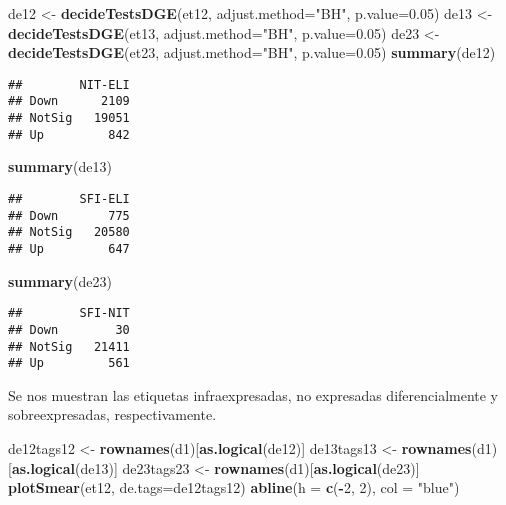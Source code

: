 \documentclass[
]{article}
\newenvironment{Shaded}{\begin{snugshade}}{\end{snugshade}}
\newcommand{\DataTypeTok}[1]{\textcolor[rgb]{0.13,0.29,0.53}{#1}}
\newcommand{\DecValTok}[1]{\textcolor[rgb]{0.00,0.00,0.81}{#1}}
\newcommand{\FloatTok}[1]{\textcolor[rgb]{0.00,0.00,0.81}{#1}}
\newcommand{\KeywordTok}[1]{\textcolor[rgb]{0.13,0.29,0.53}{\textbf{#1}}}
\newcommand{\NormalTok}[1]{#1}
\newcommand{\OperatorTok}[1]{\textcolor[rgb]{0.81,0.36,0.00}{\textbf{#1}}}
\newcommand{\StringTok}[1]{\textcolor[rgb]{0.31,0.60,0.02}{#1}}
\begin{document}
\begin{Shaded}
\begin{Highlighting}[]
\NormalTok{de12 <-}\StringTok{ }\KeywordTok{decideTestsDGE}\NormalTok{(et12, }\DataTypeTok{adjust.method=}\StringTok{"BH"}\NormalTok{, }\DataTypeTok{p.value=}\FloatTok{0.05}\NormalTok{)}
\NormalTok{de13 <-}\StringTok{ }\KeywordTok{decideTestsDGE}\NormalTok{(et13, }\DataTypeTok{adjust.method=}\StringTok{"BH"}\NormalTok{, }\DataTypeTok{p.value=}\FloatTok{0.05}\NormalTok{)}
\NormalTok{de23 <-}\StringTok{ }\KeywordTok{decideTestsDGE}\NormalTok{(et23, }\DataTypeTok{adjust.method=}\StringTok{"BH"}\NormalTok{, }\DataTypeTok{p.value=}\FloatTok{0.05}\NormalTok{)}
\KeywordTok{summary}\NormalTok{(de12)}
\end{Highlighting}
\end{Shaded}

\begin{verbatim}
##        NIT-ELI
## Down      2109
## NotSig   19051
## Up         842
\end{verbatim}

\begin{Shaded}
\begin{Highlighting}[]
\KeywordTok{summary}\NormalTok{(de13)}
\end{Highlighting}
\end{Shaded}

\begin{verbatim}
##        SFI-ELI
## Down       775
## NotSig   20580
## Up         647
\end{verbatim}

\begin{Shaded}
\begin{Highlighting}[]
\KeywordTok{summary}\NormalTok{(de23)}
\end{Highlighting}
\end{Shaded}

\begin{verbatim}
##        SFI-NIT
## Down        30
## NotSig   21411
## Up         561
\end{verbatim}

Se nos muestran las etiquetas infraexpresadas, no expresadas
diferencialmente y sobreexpresadas, respectivamente.

\begin{Shaded}
\begin{Highlighting}[]
\NormalTok{de12tags12 <-}\StringTok{ }\KeywordTok{rownames}\NormalTok{(d1)[}\KeywordTok{as.logical}\NormalTok{(de12)]}
\NormalTok{de13tags13 <-}\StringTok{ }\KeywordTok{rownames}\NormalTok{(d1)[}\KeywordTok{as.logical}\NormalTok{(de13)]}
\NormalTok{de23tags23 <-}\StringTok{ }\KeywordTok{rownames}\NormalTok{(d1)[}\KeywordTok{as.logical}\NormalTok{(de23)]}
\KeywordTok{plotSmear}\NormalTok{(et12, }\DataTypeTok{de.tags=}\NormalTok{de12tags12)}
\KeywordTok{abline}\NormalTok{(}\DataTypeTok{h =} \KeywordTok{c}\NormalTok{(}\OperatorTok{-}\DecValTok{2}\NormalTok{, }\DecValTok{2}\NormalTok{), }\DataTypeTok{col =} \StringTok{"blue"}\NormalTok{)}
\end{Highlighting}
\end{Shaded}
\end{document}
